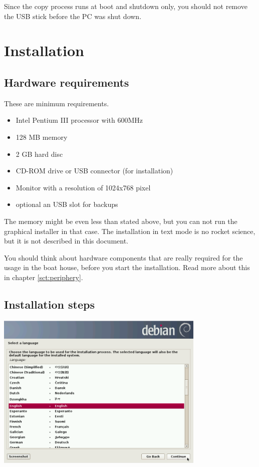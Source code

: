 \documentclass[a4paper,12pt,twoside]{article}
\begin{document}
Since the copy process runs at boot and shutdown only, you should not
remove the USB stick before the PC was shut down.


\section{Installation}
\label{sct:installation}
\subsection{Hardware requirements}
\label{sct:inst_hardware}
These are minimum requirements.

\begin{itemize}
    \item Intel Pentium III processor with 600MHz
    \item 128 MB memory
    \item 2 GB hard disc
    \item CD-ROM drive or USB connector (for installation)
    \item Monitor with a resolution of 1024x768 pixel
    \item optional an USB slot for backups
\end{itemize}

The memory might be even less than stated above, but you can not run the
graphical installer in that case. The installation in text mode is no
rocket science, but it is not described in this document.

You should think about hardware components that are really required for
the usage in the boat house, before you start the installation. Read
more about this in chapter \ref{sct:periphery}.


\subsection{Installation steps}
\label{sct:inst_steps}

\begin{minipage}{\linewidth}
    \centering
    \includegraphics[width=10cm]{efaLiveen-img/efaLiveen-img4.png}
    \label{fig:inst_language}
\end{minipage}
\bigskip
\end{document}
